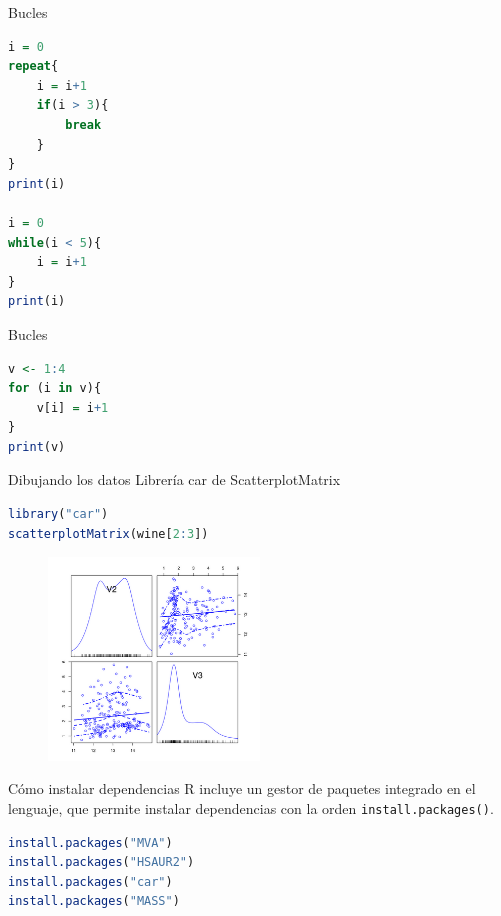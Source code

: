 \documentclass[xcolor=table]{beamer}
\begin{document}
\begin{frame}[fragile]{Bucles}
\begin{lstlisting}[language=R, basicstyle=\ttfamily]
i = 0
repeat{
    i = i+1
    if(i > 3){
        break
    }
}
print(i)

i = 0
while(i < 5){
    i = i+1
}
print(i)

\end{lstlisting}

\end{frame}

\begin{frame}[fragile]{Bucles}
\begin{lstlisting}[language=R, basicstyle=\ttfamily]
v <- 1:4
for (i in v){
    v[i] = i+1
}
print(v)
\end{lstlisting}

\end{frame}



\begin{frame}[fragile]{Dibujando los datos}
Librería car de ScatterplotMatrix

\begin{lstlisting}[language=R, basicstyle=\ttfamily]
library("car")
scatterplotMatrix(wine[2:3])
\end{lstlisting}

\begin{figure}
\includegraphics[width=0.5\textwidth]{carplot.png}
\end{figure}

\end{frame}

\begin{frame}[fragile]{Cómo instalar dependencias}
R incluye un gestor de paquetes integrado en el lenguaje, que permite instalar dependencias con la orden \texttt{install.packages()}.
  
\begin{lstlisting}[language=R, basicstyle=\ttfamily]
install.packages("MVA")
install.packages("HSAUR2")
install.packages("car")
install.packages("MASS")
\end{lstlisting}

\end{frame}
\end{document}
